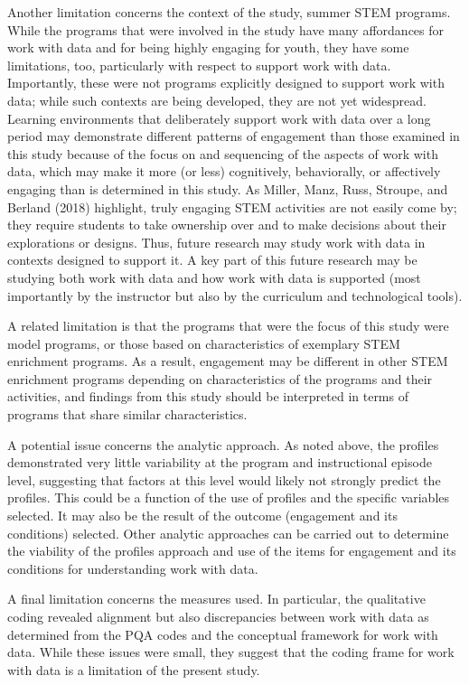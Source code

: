 \documentclass[]{msu-thesis}
\theoremstyle{definition}
\theoremstyle{definition}
\theoremstyle{definition}
\theoremstyle{remark}
\begin{document}
Another limitation concerns the context of the study, summer STEM
programs. While the programs that were involved in the study have many
affordances for work with data and for being highly engaging for youth,
they have some limitations, too, particularly with respect to support
work with data. Importantly, these were not programs explicitly designed
to support work with data; while such contexts are being developed, they
are not yet widespread. Learning environments that deliberately support
work with data over a long period may demonstrate different patterns of
engagement than those examined in this study because of the focus on and
sequencing of the aspects of work with data, which may make it more (or
less) cognitively, behaviorally, or affectively engaging than is
determined in this study. As Miller, Manz, Russ, Stroupe, and Berland
(2018) highlight, truly engaging STEM activities are not easily come by;
they require students to take ownership over and to make decisions about
their explorations or designs. Thus, future research may study work with
data in contexts designed to support it. A key part of this future
research may be studying both work with data and how work with data is
supported (most importantly by the instructor but also by the curriculum
and technological tools).

A related limitation is that the programs that were the focus of this
study were model programs, or those based on characteristics of
exemplary STEM enrichment programs. As a result, engagement may be
different in other STEM enrichment programs depending on characteristics
of the programs and their activities, and findings from this study
should be interpreted in terms of programs that share similar
characteristics.

A potential issue concerns the analytic approach. As noted above, the
profiles demonstrated very little variability at the program and
instructional episode level, suggesting that factors at this level would
likely not strongly predict the profiles. This could be a function of
the use of profiles and the specific variables selected. It may also be
the result of the outcome (engagement and its conditions) selected.
Other analytic approaches can be carried out to determine the viability
of the profiles approach and use of the items for engagement and its
conditions for understanding work with data.

A final limitation concerns the measures used. In particular, the
qualitative coding revealed alignment but also discrepancies between
work with data as determined from the PQA codes and the conceptual
framework for work with data. While these issues were small, they
suggest that the coding frame for work with data is a limitation of the
present study.
\end{document}
